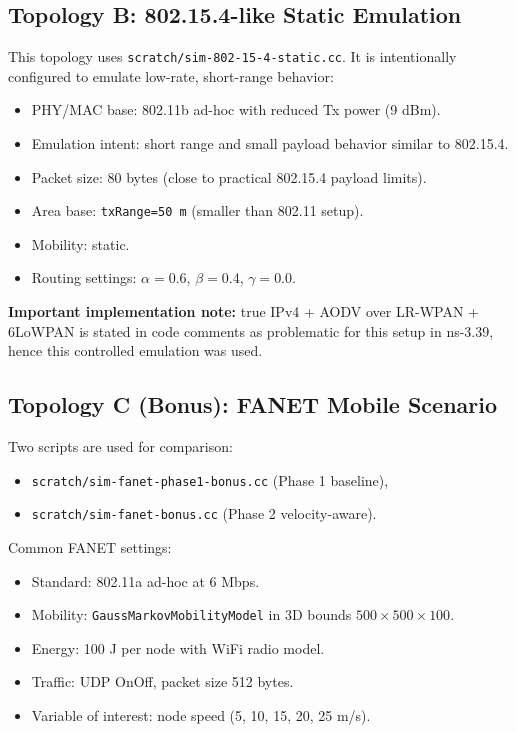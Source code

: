 \documentclass[12pt,a4paper]{article}
\begin{document}
\subsection{Topology B: 802.15.4-like Static Emulation}
This topology uses \texttt{scratch/sim-802-15-4-static.cc}. It is intentionally configured to emulate low-rate, short-range behavior:
\begin{itemize}[leftmargin=1.5em]
    \item PHY/MAC base: 802.11b ad-hoc with reduced Tx power (9 dBm).
    \item Emulation intent: short range and small payload behavior similar to 802.15.4.
    \item Packet size: 80 bytes (close to practical 802.15.4 payload limits).
    \item Area base: \texttt{txRange=50 m} (smaller than 802.11 setup).
    \item Mobility: static.
    \item Routing settings: $\alpha=0.6$, $\beta=0.4$, $\gamma=0.0$.
\end{itemize}

\textbf{Important implementation note:} true IPv4 + AODV over LR-WPAN + 6LoWPAN is stated in code comments as problematic for this setup in ns-3.39, hence this controlled emulation was used.

\subsection{Topology C (Bonus): FANET Mobile Scenario}
Two scripts are used for comparison:
\begin{itemize}[leftmargin=1.5em]
    \item \texttt{scratch/sim-fanet-phase1-bonus.cc} (Phase 1 baseline),
    \item \texttt{scratch/sim-fanet-bonus.cc} (Phase 2 velocity-aware).
\end{itemize}

Common FANET settings:
\begin{itemize}[leftmargin=1.5em]
    \item Standard: 802.11a ad-hoc at 6 Mbps.
    \item Mobility: \texttt{GaussMarkovMobilityModel} in 3D bounds $500\times500\times100$.
    \item Energy: 100 J per node with WiFi radio model.
    \item Traffic: UDP OnOff, packet size 512 bytes.
    \item Variable of interest: node speed (5, 10, 15, 20, 25 m/s).
\end{itemize}
\end{document}
